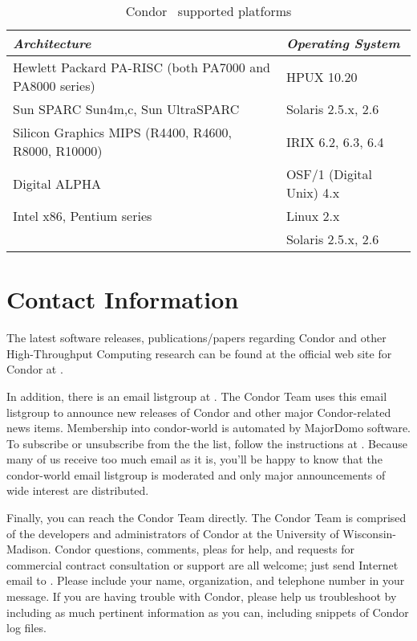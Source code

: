 \begin{center}
\begin{table}
\begin{tabular}{|ll|} \hline
\emph{Architecture} & \emph{Operating System} \\ \hline \hline
Hewlett Packard PA-RISC (both PA7000 and PA8000 series) & HPUX 10.20 \\ \hline
Sun SPARC Sun4{m,c}, Sun UltraSPARC & Solaris 2.5.x, 2.6 \\ \hline
Silicon Graphics MIPS (R4400, R4600, R8000, R10000) & IRIX 6.2, 6.3, 6.4 \\ \hline
Digital ALPHA & OSF/1 (Digital Unix) 4.x \\ \hline
Intel x86, Pentium series & Linux 2.x \\
 & Solaris 2.5.x, 2.6 \\ \hline
\end{tabular}
\caption{\label{supported-platforms}Condor \VersionNotice\ supported platforms}
\end{table}
\end{center}



\section{\label{contact-info}Contact Information}

The latest software releases, publications/papers regarding Condor and other 
High-Throughput Computing
research can be found at the official web site for Condor at  
.

In addition, there is an email listgroup at .  The Condor Team 
uses this email listgroup to announce new releases of Condor and other major Condor-related 
news items.  Membership into condor-world is automated by MajorDomo software.  To 
subscribe or unsubscribe from the the list, follow the instructions at  
.  Because many of us receive 
too much email as it is, you'll be happy to know that the condor-world email listgroup is 
moderated and only major announcements of wide interest are distributed.

Finally, you can reach the Condor Team directly.  The Condor Team is comprised of the 
developers and administrators of Condor at the University of Wisconsin-Madison. Condor 
questions, comments, pleas for help, and requests for commercial contract consultation or support 
are all welcome; just send Internet email to .  Please include your 
name, organization, and telephone number in your message.  If you are having trouble with 
Condor, please help us troubleshoot by including as much pertinent information as you can, 
including snippets of Condor log files. 


